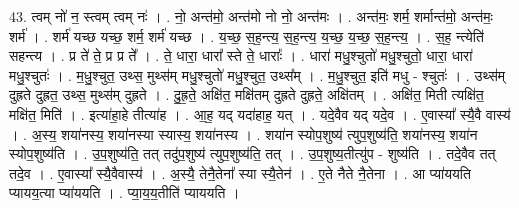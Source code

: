 \documentclass[17pt]{extarticle}
\begin{document}
43. त्वम् नो॑ न॒ स्त्वम् त्वम् नः॑ । . नो॒ अन्त॑मो॒ अन्त॑मो नो नो॒ अन्त॑मः । . अन्त॑मः॒ शर्म॒ शर्मान्त॑मो॒ अन्त॑मः॒ शर्म॑ । . शर्म॑ यच्छ यच्छ॒ शर्म॒ शर्म॑ यच्छ । . य॒च्छ॒ स॒ह॒न्त्य॒ स॒ह॒न्त्य॒ य॒च्छ॒ य॒च्छ॒ स॒ह॒न्त्य॒ । . स॒ह॒ न्त्येति॑ सहन्त्य । . प्र ते॑ ते॒ प्र प्र ते᳚ । . ते॒ धारा॒ धारा᳚ स्ते ते॒ धाराः᳚ । . धारा॑ मधु॒श्चुतो॑ मधु॒श्चुतो॒ धारा॒ धारा॑ मधु॒श्चुतः॑ । . म॒धु॒श्चुत॒ उथ्स॒ मुथ्स॑म् मधु॒श्चुतो॑ मधु॒श्चुत॒ उथ्स᳚म् । . म॒धु॒श्चुत॒ इति॑ मधु - श्चुतः॑ । . उथ्स॑म् दुह्रते दुह्रत॒ उथ्स॒ मुथ्स॑म् दुह्रते । . दु॒ह्र॒ते॒ अक्षि॑त॒ मक्षि॑तम् दुह्रते दुह्रते॒ अक्षि॑तम् । . अक्षि॑त॒ मिती त्यक्षि॑त॒ मक्षि॑त॒ मिति॑ । . इत्या॑हा॒हे तीत्या॑ह । . आ॒ह॒ यद् यदा॑हाह॒ यत् । . यदे॒वैव यद् यदे॒व । . ए॒वास्या᳚ स्यै॒वै वास्य॑ । . अ॒स्य॒ शया॑नस्य॒ शया॑नस्या स्यास्य॒ शया॑नस्य । . शया॑न स्योप॒शुष्य॑ त्युप॒शुष्य॑ति॒ शया॑नस्य॒ शया॑न स्योप॒शुष्य॑ति । . उ॒प॒शुष्य॑ति॒ तत् तदु॑प॒शुष्य॑ त्युप॒शुष्य॑ति॒ तत् । . उ॒प॒शुष्य॒तीत्यु॑प - शुष्य॑ति । . तदे॒वैव तत् तदे॒व । . ए॒वास्या᳚ स्यै॒वैवास्य॑ । . अ॒स्यै॒ तेनै॒तेना᳚ स्या स्यै॒तेन॑ । . ए॒ते नैते नै॒तेना । . आ प्या॑ययति प्यायय॒त्या प्या॑ययति । . प्या॒य॒य॒तीति॑ प्याययति । \newline
\pagebreak
{}
\end{document}
